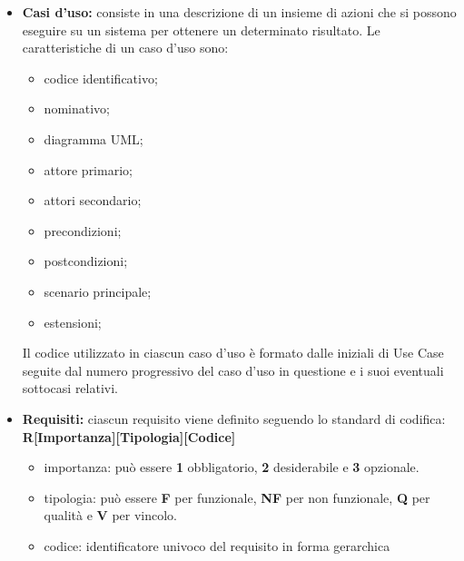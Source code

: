     \begin{itemize}
        \item \textbf{Casi d'uso:} consiste in una descrizione di un insieme di azioni che si possono eseguire su un sistema per ottenere un determinato risultato.
        Le caratteristiche di un caso d'uso sono:
        \begin{itemize}
            \item {codice identificativo;}
            \item {nominativo;}
            \item {diagramma UML;}
            \item {attore primario;}
            \item {attori secondario;}
            \item {precondizioni;}
            \item {postcondizioni;}
            \item {scenario principale;}
            \item {estensioni;}
        \end{itemize}
        Il codice utilizzato in ciascun caso d'uso è formato dalle iniziali di Use Case seguite dal numero progressivo del caso d'uso in questione e i suoi eventuali sottocasi relativi.
        \item \textbf{Requisiti:} ciascun requisito viene definito seguendo lo standard di codifica:\\
        \textbf{R[Importanza][Tipologia][Codice]}
        \begin {itemize}
            \item{importanza:} può essere \textbf{1} obbligatorio, \textbf{2} desiderabile e \textbf{3} opzionale.
            \item {tipologia:} può essere \textbf{F} per funzionale, \textbf{NF} per non funzionale, \textbf{Q} per qualità e \textbf{V} per vincolo.
            \item {codice:} identificatore univoco del requisito in forma gerarchica
        \end {itemize}
    \end{itemize}


